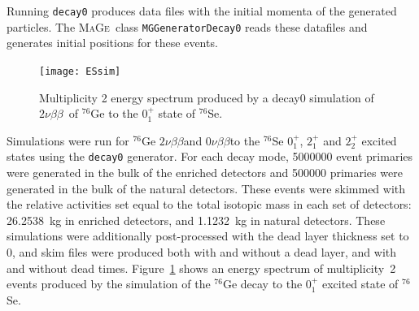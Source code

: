 \documentclass[notitlepage,rmp,aps,10pt]{revtex4-1}
\newcommand{\znbb}{${0 \nu \beta \beta}$}
\newcommand{\tnbb}{${2 \nu \beta \beta}$}
\newcommand{\Mage}{\textsc{MaGe}}
\newcommand{\iso}[2]{$^{#1}$#2}
\newcommand{\Ge}[1]{\iso{#1}{Ge}}
\newcommand{\Se}[1]{\iso{#1}{Se}}
\newcommand{\SP}[3]{$#1^{#2}_{#3}$}
\begin{document}
Running \texttt{decay0} produces data files with the initial momenta of the generated particles.
The \Mage\ class \texttt{MGGeneratorDecay0} reads these datafiles and generates initial positions for these events.
\\
\begin{figure}[h]
  \centering
  \texttt{[image: ESsim]}
  \caption[Simulation of multiplicty 2 events from \tnbb\ to \SP{0}{+}{1}]{\label{fig:2dessim}
    Multiplicity 2 energy spectrum produced by a decay0 simulation of \tnbb\ of \Ge{76} to the \SP{0}{+}{1} state of \Se{76}.
  }
\end{figure}
Simulations were run for \Ge{76} \tnbb and \znbb to the \Se{76} \SP{0}{+}{1}, \SP{2}{+}{1} and \SP{2}{+}{2} excited states using the \texttt{decay0} generator.
For each decay mode, 5000000 event primaries were generated in the bulk of the enriched detectors and 500000 primaries were generated in the bulk of the natural detectors.
These events were skimmed with the relative activities set equal to the total isotopic mass in each set of detectors: 26.2538~kg in enriched detectors, and 1.1232~kg in natural detectors.
These simulations were additionally post-processed with the dead layer thickness set to 0, and skim files were produced both with and without a dead layer, and with and without dead times.
Figure~\ref{fig:2dessim} shows an energy spectrum of multiplicity~2 events produced by the simulation of the \Ge{76} decay to the \SP{0}{+}{1} excited state of \Se{76}.
\\
\end{document}
